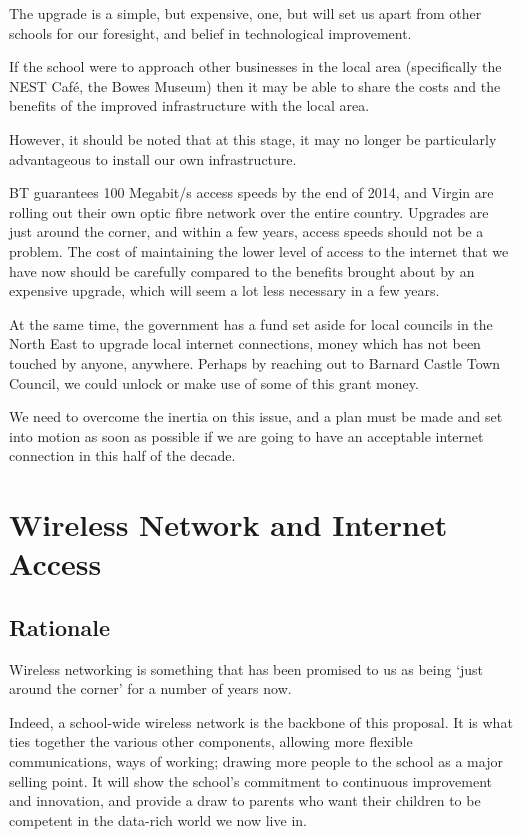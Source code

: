 \documentclass[a4paper,leqno,titlepage]{article}
\begin{document}
The upgrade is a simple, but expensive, one, but will set us apart from other
schools for our foresight, and belief in technological improvement.


If the school were to approach other businesses in the local area (specifically
the NEST Café, the Bowes Museum) then it may be able to share the costs
and the benefits of the improved infrastructure with the local area.


However, it should be noted that at this stage, it may no longer be particularly
advantageous to install our own infrastructure.


BT guarantees 100 Megabit/s access speeds by the end of 2014,
and Virgin are rolling out their own optic fibre network over
the entire country. Upgrades are just around the corner, and within a few years,
access speeds should not be a problem. The cost of maintaining the lower level
of access to the internet that we have now should be carefully compared to
the benefits brought about by an expensive upgrade, which will seem a lot less
necessary in a few years.


At the same time, the government has a fund set aside for local councils in
the North East to upgrade local internet connections, money which has not been
touched by anyone, anywhere. Perhaps by reaching out to Barnard Castle Town
Council, we could unlock or make use of some of this grant money.


We need to overcome the inertia on this issue, and a plan must be made and set
into motion as soon as possible if we are going to have an acceptable internet
connection in this half of the decade.






\section{Wireless Network and Internet Access}


\subsection{Rationale}

Wireless networking is something that has been promised to us as being `just
around the corner' for a number of years now.


Indeed, a school-wide wireless network is the backbone of this proposal. It is
what ties together the various other components, allowing more flexible
communications, ways of working; drawing more people to the school as a
major selling point. It will show the school's commitment to continuous
improvement and innovation, and provide a draw to parents who want their
children to be competent in the data-rich world we now live in.
\end{document}
